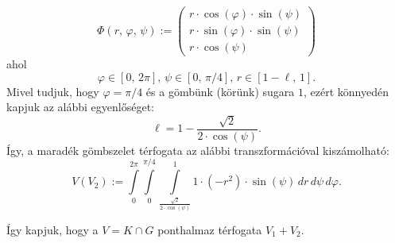 \documentclass[12pt]{article}
\begin{document}
    \[
        \Phi(r, \, \varphi, \, \psi) :=
        \begin{pmatrix}
            r \cdot \cos(\varphi) \cdot \sin(\psi) \\
            r \cdot \sin(\varphi) \cdot \sin(\psi) \\
            r \cdot \cos(\psi)
        \end{pmatrix}
    \]
    ahol
    \[
        \varphi \in [0, \, 2 \pi], \, \psi \in [0, \, \pi / 4], \, r \in [1 - \ell, \, 1].
    \]
    Mivel tudjuk, hogy $\varphi = \pi / 4$ és a gömbünk (körünk) sugara $1$, ezért könnyedén kapjuk az alábbi egyenlőséget:
    \[
        \ell = 1 - \frac{\sqrt{2}}{2 \cdot \cos(\psi)}.
    \]
    Így, a maradék gömbszelet térfogata az alábbi transzformációval kiszámolható:
    \[
        V(V_2) := \int\limits_0^{2\pi} \int\limits_0^{\pi / 4} \int\limits_{\frac{\sqrt{2}}{2\cdot \cos(\psi)}}^1 1 \cdot (-r^2) \cdot \sin(\psi) \, dr \, d\psi \, d\varphi.
    \]

    Így kapjuk, hogy a $V = K \cap G$ ponthalmaz térfogata $V_1 + V_2$.
\end{document}
